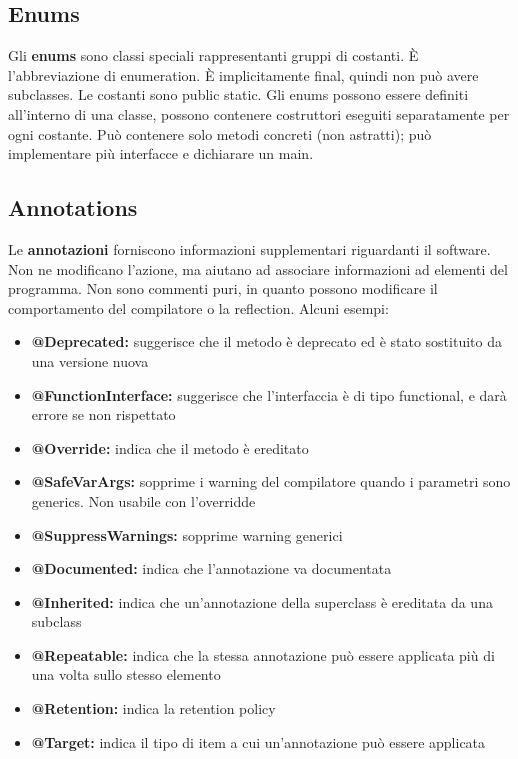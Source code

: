 \documentclass[11pt]{article}
\begin{document}
\subsection{Enums}
Gli \textbf{enums} sono classi speciali rappresentanti gruppi di costanti. È l'abbreviazione di enumeration. È implicitamente final, quindi non può avere subclasses. Le costanti sono public static.
Gli enums possono essere definiti all'interno di una classe, possono contenere costruttori eseguiti separatamente per ogni costante. Può contenere solo metodi concreti (non astratti); può implementare più interfacce e dichiarare un main. 
\subsection{Annotations}
Le \textbf{annotazioni} forniscono informazioni supplementari riguardanti il software. Non ne modificano l'azione, ma aiutano ad associare informazioni ad elementi del programma. Non sono commenti puri, in quanto possono modificare il comportamento del compilatore o la reflection. 
Alcuni esempi:
\begin{itemize}
    \item \textbf{@Deprecated:} suggerisce che il metodo è deprecato ed è stato sostituito da una versione nuova
    \item \textbf{@FunctionInterface:} suggerisce che l'interfaccia è di tipo functional, e darà errore se non rispettato
    \item \textbf{@Override:} indica che il metodo è ereditato 
    \item \textbf{@SafeVarArgs:} sopprime i warning del compilatore quando i parametri sono generics. Non usabile con l'overridde
    \item \textbf{@SuppressWarnings:} sopprime warning generici
    \item \textbf{@Documented:} indica che l'annotazione va documentata
    \item \textbf{@Inherited:} indica che un'annotazione della superclass è ereditata da una subclass
    \item \textbf{@Repeatable:} indica che la stessa annotazione può essere applicata più di una volta sullo stesso elemento
    \item \textbf{@Retention:} indica la retention policy
    \item \textbf{@Target:} indica il tipo di item a cui un'annotazione può essere applicata
\end{itemize}
\end{document}
